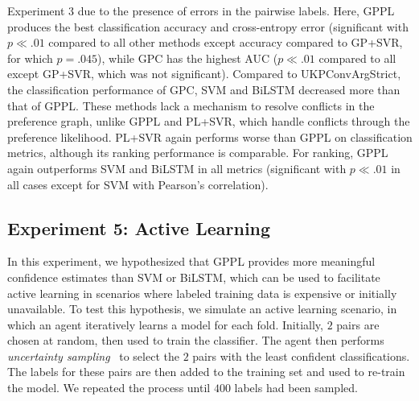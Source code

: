 Experiment 3 due to the presence of errors in the pairwise labels. 
Here, GPPL produces the best classification accuracy and cross-entropy error (significant with $p\ll.01$ compared to all other methods except accuracy compared to GP+SVR, for which $p=.045$), while GPC has the highest AUC ($p\ll.01$ compared to all except GP+SVR, which was not significant). 
Compared to UKPConvArgStrict, the classification performance of GPC, SVM and BiLSTM decreased more than that of GPPL.
These methods lack a mechanism to resolve conflicts in the preference graph, unlike GPPL and PL+SVR, which handle conflicts through the preference likelihood.  
PL+SVR again performs worse than GPPL on classification metrics, although its ranking performance is comparable. 
For ranking, GPPL again outperforms SVM and BiLSTM in all metrics (significant with $p\ll.01$ in all cases except for SVM with Pearson's correlation).



\subsection{Experiment 5: Active Learning}

In this experiment, we hypothesized that GPPL provides more meaningful confidence estimates than SVM or BiLSTM,
which can be used to facilitate active learning in scenarios where labeled training data is expensive
or initially unavailable.
To test this hypothesis, we simulate an active learning scenario, in which an agent 
iteratively learns a model for each fold. Initially, $2$ pairs are chosen at random, then used to train the classifier. The agent then performs \emph{uncertainty sampling}~\cite{settles2010active} 
to select the $2$ pairs with the least confident classifications. 
The labels for these pairs are then added to the training set and 
used to re-train the model. We repeated the process until $400$ labels had been sampled. 

